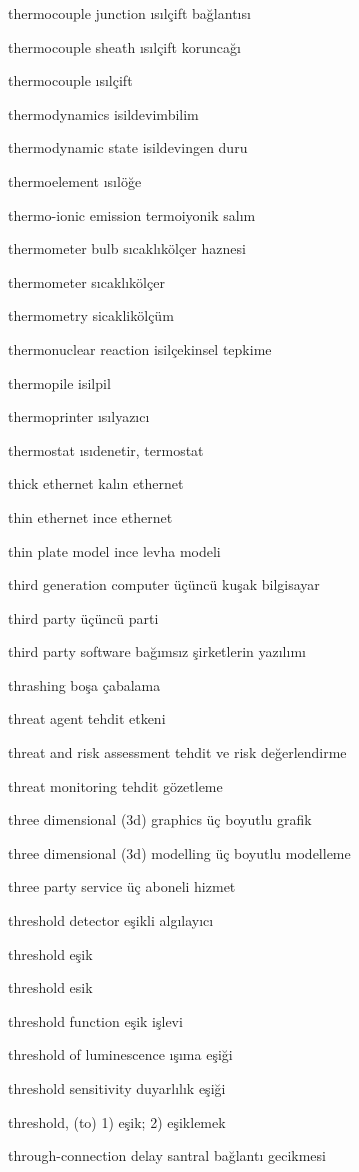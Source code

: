 \documentclass[12pt,fleqn]{article}\usepackage{../../common}
\begin{document}
thermocouple junction ısılçift bağlantısı

thermocouple sheath ısılçift koruncağı

thermocouple ısılçift

thermodynamics isildevimbilim

thermodynamic state isildevingen duru

thermoelement ısılöğe

thermo-ionic emission termoiyonik salım

thermometer bulb sıcaklıkölçer haznesi

thermometer sıcaklıkölçer

thermometry sicaklikölçüm

thermonuclear reaction isilçekinsel tepkime

thermopile isilpil

thermoprinter ısılyazıcı

thermostat ısıdenetir, termostat

thick ethernet kalın ethernet

thin ethernet ince ethernet

thin plate model ince levha modeli

third generation computer üçüncü kuşak bilgisayar

third party üçüncü parti

third party software bağımsız şirketlerin yazılımı

thrashing boşa çabalama

threat agent tehdit etkeni

threat and risk assessment tehdit ve risk değerlendirme

threat monitoring tehdit gözetleme

three dimensional (3d) graphics üç boyutlu grafik

three dimensional (3d) modelling üç boyutlu modelleme

three party service üç aboneli hizmet

threshold detector eşikli algılayıcı

threshold eşik

threshold esik

threshold function eşik işlevi

threshold of luminescence ışıma eşiği

threshold sensitivity duyarlılık eşiği

threshold, (to) 1) eşik; 2) eşiklemek

through-connection delay santral bağlantı gecikmesi
\end{document}
